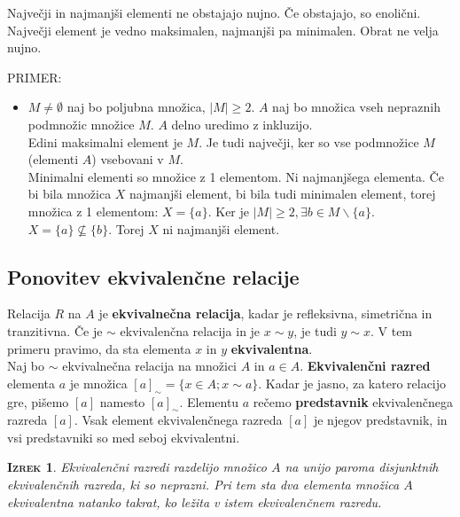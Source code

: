 \documentclass[a4paper,12pt]{article}
\newtheorem*{izrek}{\textsc{Izrek}}
\begin{document}
Največji in najmanjši elementi ne obstajajo nujno. Če obstajajo, so enolični. Največji  \linebreak element je vedno maksimalen, najmanjši pa minimalen. Obrat ne velja nujno. \\

\newpage 

PRIMER:
\begin{itemize}
\item $M\neq \emptyset$ naj bo poljubna množica, $|M|\geq 2$. $A$ naj bo množica vseh nepraznih  \linebreak podmnožic množice $M$. $A$ delno uredimo z inkluzijo. \\

Edini maksimalni element je $M$. Je tudi največji, ker so vse podmnožice $M$ (elementi $A$) vsebovani v $M$. \\

Minimalni elementi so množice z 1 elementom. Ni najmanjšega elementa. Če bi bila množica $X$ najmanjši element, bi bila tudi minimalen element, torej množica z 1 elementom: $X=\{a\}$. Ker je $|M|\geq 2,\exists b \in M \backslash \{a\}$. $X=\{a\} \not\subseteq \{b\}$. Torej $X$ ni najmanjši element.\\
\end{itemize} 

\newpage 

\subsection{Ponovitev ekvivalenčne relacije}

Relacija $R$ na $A$ je \textbf{ekvivalnečna relacija}, kadar je refleksivna, simetrična in tranzitivna. Če je $\sim$ ekvivalenčna relacija in je $x\sim y$, je tudi $y\sim x$. V tem primeru pravimo, da sta elementa $x$ in $y$ \textbf{ekvivalentna}. \\

Naj bo $\sim$ ekvivalnečna relacija na množici $A$ in $a\in A$. \textbf{Ekvivalenčni razred} elementa $a$ je množica $[a]_\sim=\{x\in A;x\sim a\}$. Kadar je jasno, za katero relacijo gre, pišemo $[a]$ namesto $[a]_\sim$. Elementu $a$ rečemo \textbf{predstavnik} ekvivalenčnega razreda $[a]$. Vsak element  \linebreak ekvivalenčnega razreda $[a]$ je njegov predstavnik, in vsi predstavniki so med seboj \linebreak  ekvivalentni. \\

\begin{izrek}
Ekvivalenčni razredi razdelijo množico $A$ na unijo paroma disjunktnih ekvivalenčnih razreda, ki so neprazni. Pri tem sta dva elementa množica $A$ ekvivalentna natanko takrat, ko ležita v istem ekvivalenčnem razredu. \\
\end{izrek}
\end{document}
